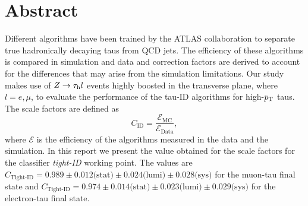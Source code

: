\chapter*{Abstract}
Different algorithms have been trained by the ATLAS collaboration to separate true hadronically decaying taus from QCD jets. The efficiency of these algorithms is compared in simulation and data and correction factors are derived to account for the differences that may arise from the simulation limitations. Our study makes use of $Z\to\tau_\text{h} l$ events highly boosted in the transverse plane, where $l=e,\mu$,  to evaluate the performance of the tau-ID algorithms for high-$p_\text{T}$ taus. The scale factors are defined as
\begin{equation}
	C_{\text{ID}}=\frac{\mathcal{E}_{\text{MC}}}{\mathcal{E}_{\text{Data}}},\nonumber
\end{equation}
where $\mathcal{E}$ is the efficiency of the algorithms measured in the data and the simulation. In this report we present the value obtained for the scale factors for the classifier \textit{tight-ID} working point. The values are $C_{\text{Tight-ID}}=0.989\pm 0.012\text{(stat)}\pm 0.024\text{(lumi)}\pm 0.028\text{(sys)}$ for the muon-tau final state and $C_{\text{Tight-ID}}=0.974\pm 0.014\text{(stat)}\pm 0.023\text{(lumi)}\pm 0.029\text{(sys)}$ for the electron-tau final state.


